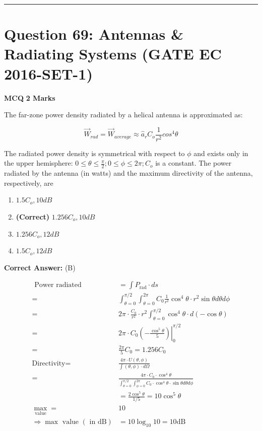 \documentclass[11pt,a4paper]{article}
\begin{document}
\vspace{1.5em}
\hrule
\vspace{1.5em}

\section*{Question 69: Antennas \& Radiating Systems (GATE EC 2016-SET-1)}
\noindent \textbf{\color{primary}MCQ} \hfill \textbf{\color{secondary}2 Marks}


\noindent The far-zone power density radiated by a helical antenna is approximated as: 

\[
\vec{W}_{rad}=\vec{W}_{average}\approx \hat{a}_{r}C_{o}\frac{1}{r^{2}}cos^{4}\theta
\]

  The radiated power density is symmetrical with respect to $\phi$ and exists only in the upper hemisphere: $0\leq \theta \leq \frac{\pi }{2};0\leq \phi \leq 2\pi;C_{o}$ is a constant. The power radiated by the antenna (in watts) and the maximum directivity of the antenna, respectively, are


\begin{enumerate}[label=(\Alph*)]
    \item $1.5C_{o},10dB$
    \item \textbf{(Correct)} $1.256C_{o},10dB$
    \item $1.256C_{o},12dB$
    \item $1.5C_{o},12dB$
\end{enumerate}

\noindent \textbf{Correct Answer:} (B)

\begin{tcolorbox}[solbox, title=Detailed Solution -- Question 69]
\[
\begin{aligned} \text { Power radiated }&=\int P_{\mathrm{rad}} \cdot d s \\ =& \int_{\theta=0}^{\pi / 2} \int_{\theta=0}^{2 \pi} C_{0} \frac{1}{r^{2}} \cos ^{4} \theta \cdot r^{2} \sin \theta d \theta d \phi \\ =& 2 \pi \cdot \frac{C_{0}}{r^{2}} \cdot r^{2} \int_{\theta=0}^{\pi / 2} \cos ^{4} \theta \cdot d(-\cos \theta) \\ =&\left.2 \pi \cdot C_{0}\left(-\frac{\cos ^{5} \theta}{5}\right)\right|_{0} ^{\pi / 2} \\ =& \frac{2 \pi}{5} C_{0}=1.256 C_{0} \\ \text{Directivity}=& \frac{4 \pi \cdot U(\theta, \phi)}{\int(\theta, \phi) \cdot d \Omega} \\ =& \frac{4 \pi \cdot C_{0} \cdot \cos ^{4} \theta}{\int_{\theta=0}^{\pi / 2}\int_{\phi=0}^{2\pi}C_{0} \cdot \cos ^{4} \theta \cdot \sin \theta d \theta d \phi} \\ &=\frac{2 \cos ^{5} \theta}{1 / 5}=10 \cos ^{5} \theta \\ \max _{\operatorname{value}}=& 10 \\ \Rightarrow \max \text { value }(\text { in } \mathrm{dB}) &=10 \log _{10} 10=10 \mathrm{dB} \end{aligned}
\]
\end{tcolorbox}
\end{document}
